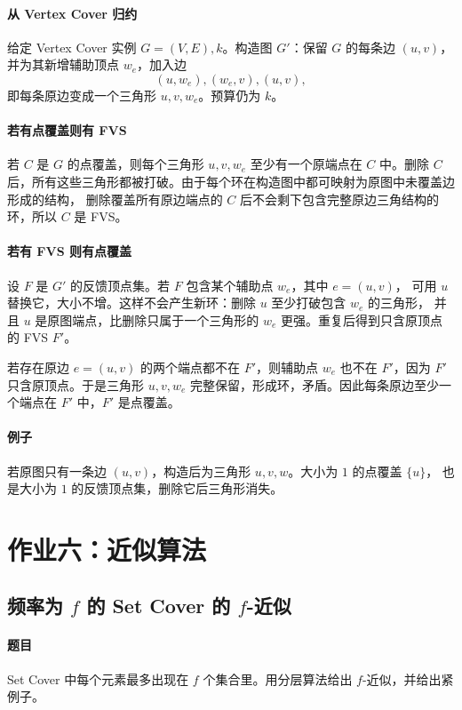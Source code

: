 \documentclass[UTF8,openany,12pt]{ctexbook}
\theoremstyle{remark}
\begin{document}
\paragraph{从 Vertex Cover 归约}
给定 Vertex Cover 实例 $G=(V,E),k$。构造图 $G'$：保留 $G$ 的每条边 $(u,v)$，
并为其新增辅助顶点 $w_e$，加入边
\[
  (u,w_e),(w_e,v),(u,v),
\]
即每条原边变成一个三角形 $u,v,w_e$。预算仍为 $k$。

\paragraph{若有点覆盖则有 FVS}
若 $C$ 是 $G$ 的点覆盖，则每个三角形 $u,v,w_e$ 至少有一个原端点在 $C$ 中。删除
$C$ 后，所有这些三角形都被打破。由于每个环在构造图中都可映射为原图中未覆盖边形成的结构，
删除覆盖所有原边端点的 $C$ 后不会剩下包含完整原边三角结构的环，所以 $C$ 是 FVS。

\paragraph{若有 FVS 则有点覆盖}
设 $F$ 是 $G'$ 的反馈顶点集。若 $F$ 包含某个辅助点 $w_e$，其中 $e=(u,v)$，
可用 $u$ 替换它，大小不增。这样不会产生新环：删除 $u$ 至少打破包含 $w_e$ 的三角形，
并且 $u$ 是原图端点，比删除只属于一个三角形的 $w_e$ 更强。重复后得到只含原顶点的
FVS $F'$。

若存在原边 $e=(u,v)$ 的两个端点都不在 $F'$，则辅助点 $w_e$ 也不在 $F'$，因为
$F'$ 只含原顶点。于是三角形 $u,v,w_e$ 完整保留，形成环，矛盾。因此每条原边至少一个端点在
$F'$ 中，$F'$ 是点覆盖。

\paragraph{例子}
若原图只有一条边 $(u,v)$，构造后为三角形 $u,v,w$。大小为 $1$ 的点覆盖 $\{u\}$，
也是大小为 $1$ 的反馈顶点集，删除它后三角形消失。

\section{作业六：近似算法}

\subsection[频率为 f 的 Set Cover 的 f-近似]{频率为 $f$ 的 Set Cover 的 $f$-近似}

\paragraph{题目}
Set Cover 中每个元素最多出现在 $f$ 个集合里。用分层算法给出 $f$-近似，并给出紧例子。
\end{document}
